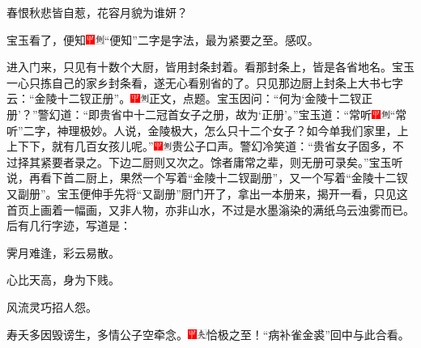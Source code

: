 春恨秋悲皆自惹，花容月貌为谁妍？

宝玉看了，便知{\includegraphics[width=3mm]{../Images/00002}\includegraphics[width=3mm]{../Images/00011}\footnotesize \kaishu “便知”二字是字法，最为紧要之至。}感叹。

进入门来，只见有十数个大厨，皆用封条封着。看那封条上，皆是各省地名。宝玉一心只拣自己的家乡封条看，遂无心看别省的了。只见那边厨上封条上大书七字云：“金陵十二钗正册”。{\includegraphics[width=3mm]{../Images/00002}\includegraphics[width=3mm]{../Images/00011}\footnotesize \kaishu 正文，点题。}宝玉因问：“何为‘金陵十二钗正册’？”警幻道：“即贵省中十二冠首女子之册，故为‘正册’。”宝玉道：“常听{\includegraphics[width=3mm]{../Images/00002}\includegraphics[width=3mm]{../Images/00011}\footnotesize \kaishu “常听”二字，神理极妙。}人说，金陵极大，怎么只十二个女子？如今单我们家里，上上下下，就有几百女孩儿呢。”{\includegraphics[width=3mm]{../Images/00002}\includegraphics[width=3mm]{../Images/00011}\footnotesize \kaishu 贵公子口声。}警幻冷笑道：“贵省女子固多，不过择其紧要者录之。下边二厨则又次之。馀者庸常之辈，则无册可录矣。”宝玉听说，再看下首二厨上，果然一个写着“金陵十二钗副册”，又一个写着“金陵十二钗又副册”。宝玉便伸手先将“又副册”厨门开了，拿出一本册来，揭开一看，只见这首页上画着一幅画，又非人物，亦非山水，不过是水墨滃染的满纸乌云浊雾而已。后有几行字迹，写道是：

霁月难逢，彩云易散。

心比天高，身为下贱。

风流灵巧招人怨。

寿夭多因毁谤生，多情公子空牵念。{\includegraphics[width=3mm]{../Images/00002}\includegraphics[width=3mm]{../Images/00012}\footnotesize \kaishu 恰极之至！“病补雀金裘”回中与此合看。}


